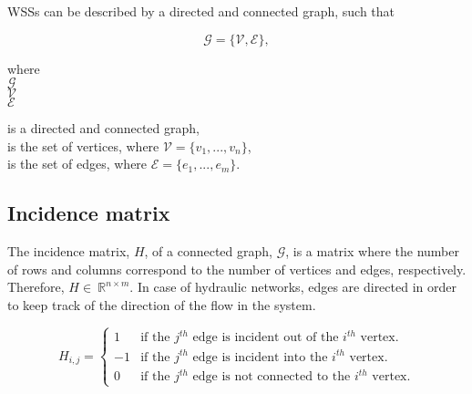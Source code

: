 WSSs can be described by a directed and connected graph, such that \cite{graph_intro} 

\begin{equation}
  \label{Numberofchords}
  \mathcal{G} = \{\mathcal{V}, \mathcal{E} \} ,
\end{equation}

\vspace{-3mm}

\begin{minipage}[t]{0.2\textwidth}
where\\
\hspace*{8mm} $\mathcal{G} $ \\
\hspace*{8mm} $\mathcal{V} $ \\
\hspace*{8mm} $\mathcal{E} $
\end{minipage}
\begin{minipage}[t]{0.68\textwidth}
\vspace*{2mm}
is a directed and connected graph,\\
is the set of vertices, where $\mathcal{V} = \{v_1, ..., v_n\}$,\\
is the set of edges, where $\mathcal{E} = \{e_1, ..., e_m\}$. 
\end{minipage}

\subsection{Incidence matrix}
\label{incidence_matrix}

The incidence matrix, $H$, of a connected graph, $\mathcal{G}$, is a matrix where the number of rows and columns correspond to the number of vertices and edges, respectively. Therefore, $H\in \: \mathbb{R}^{n \times m}$. In case of hydraulic networks, edges are directed in order to keep track of the direction of the flow in the system. 

\begin{equation}
\label{DiGraph}
 H_{i,j} =
		\left\{
		\begin{array}{ll}
		
		1 			&      \text{if the $j^{th}$ edge is incident out of the $i^{th}$ vertex}.	
\\
	    -1          &      \text{if the $j^{th}$ edge is incident into the $i^{th}$ vertex}.
\\
        0           &      \text{if the $j^{th}$ edge is not connected to the $i^{th}$ vertex}.

		\end{array}
		\right.
\end{equation}	

